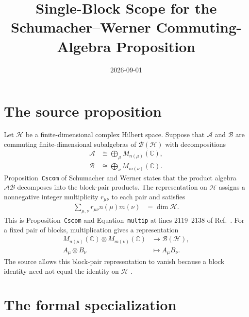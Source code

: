 \documentclass{article}
\title{Single-Block Scope for the Schumacher--Werner Commuting-Algebra Proposition}
\author{}
\date{2026-09-01}
\begin{document}
\maketitle
{}

\section{The source proposition}

Let $\mathcal H$ be a finite-dimensional complex Hilbert space. Suppose that
$\mathcal A$ and $\mathcal B$ are commuting finite-dimensional subalgebras of
$\mathcal B(\mathcal H)$ with decompositions
\begin{align}
    \mathcal A
     & \cong\bigoplus_{\mu}M_{n(\mu)}(\mathbb C),
    \label{eq:gnvw12_cscom_single_block_scope_left_decomposition} \\
    \mathcal B
     & \cong\bigoplus_{\nu}M_{m(\nu)}(\mathbb C).
    \label{eq:gnvw12_cscom_single_block_scope_right_decomposition}
\end{align}
Proposition~\texttt{Cscom} of Schumacher and Werner states that the product
algebra $\mathcal A\mathcal B$ decomposes into the block-pair products. The
representation on $\mathcal H$ assigns a nonnegative integer multiplicity
$r_{\mu\nu}$ to each pair and satisfies
\begin{align}
    \sum_{\mu,\nu}r_{\mu\nu}n(\mu)m(\nu)
     & =\dim\mathcal H.
    \label{eq:gnvw12_cscom_single_block_scope_multiplicity}
\end{align}
This is Proposition~\texttt{Cscom} and Equation~\texttt{multip} at lines
2119--2138 of Ref.~\cite{SchumacherWerner2004QCA}. For a fixed pair of
blocks, multiplication gives a representation
\begin{align}
    M_{n(\mu)}(\mathbb C)\otimes M_{m(\nu)}(\mathbb C)
     & \longrightarrow\mathcal B(\mathcal H),
    \label{eq:gnvw12_cscom_single_block_scope_block_representation} \\
    A_{\mu}\otimes B_{\nu}
     & \longmapsto A_{\mu}B_{\nu}.
    \label{eq:gnvw12_cscom_single_block_scope_block_multiplication}
\end{align}
The source allows this block-pair representation to vanish because a block
identity need not equal the identity on $\mathcal H$
\cite{SchumacherWerner2004QCA}.

\section{The formal specialization}
\end{document}
